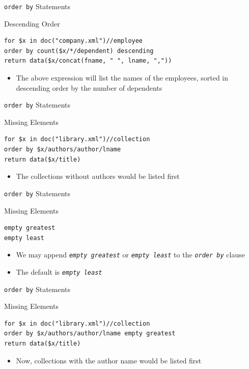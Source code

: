 \documentclass[svgnames]{beamer}
\begin{document}
\begin{frame}[fragile]{\texttt{order by} Statements}
\small
\begin{block}{Descending Order}
\begin{verbatim}
for $x in doc("company.xml")//employee
order by count($x/*/dependent) descending
return data($x/concat(fname, " ", lname, ","))
\end{verbatim}
\end{block}
\normalsize
\begin{itemize}
	\item The above expression will list the names of the employees, sorted in descending order by the number of dependents
\end{itemize}
\end{frame}

\begin{frame}[fragile]{\texttt{order by} Statements}
\small
\begin{block}{Missing Elements}
\begin{verbatim}
for $x in doc("library.xml")//collection
order by $x/authors/author/lname
return data($x/title)
\end{verbatim}
\end{block}
\normalsize
\begin{itemize}
	\item The collections without authors would be listed first
\end{itemize}
\end{frame}

\begin{frame}[fragile]{\texttt{order by} Statements}
\small
\begin{block}{Missing Elements}
\begin{verbatim}
empty greatest
empty least
\end{verbatim}
\end{block}
\normalsize
\begin{itemize}
	\item We may append \emph{\tt empty greatest} or \emph{\tt empty least} to the \emph{\tt order by} clause
	\item The default is \emph{\tt empty least}
\end{itemize}
\end{frame}

\begin{frame}[fragile]{\texttt{order by} Statements}
\small
\begin{block}{Missing Elements}
\begin{verbatim}
for $x in doc("library.xml")//collection
order by $x/authors/author/lname empty greatest
return data($x/title)
\end{verbatim}
\end{block}
\normalsize
\begin{itemize}
	\item Now, collections with the author name would be listed first
\end{itemize}
\end{frame}
\end{document}
